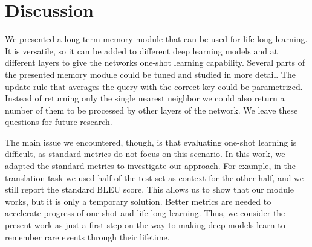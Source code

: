 \documentclass{article} \usepackage{iclr2017_conference,times}
\begin{document}
\section{Discussion}

We presented a long-term memory module that can be used for life-long learning.
It is versatile, so it can be added to different deep learning models and
at different layers to give the networks one-shot learning capability.
Several parts of the presented memory module could be tuned and studied
in more detail. The update rule that averages the query with the correct
key could be parametrized. Instead of returning only the single nearest neighbor
we could also return a number of them to be processed by other layers of
the network. We leave these questions for future research.

The main issue we encountered, though, is that evaluating one-shot learning
is difficult, as standard metrics do not focus on this scenario. In this work,
we adapted the standard metrics to investigate our approach. For example,
in the translation task we used half of the test set as context for the other half,
and we still report the standard BLEU score. This allows us to show that our
module works, but it is only a temporary solution.
Better metrics are needed to accelerate progress of one-shot and life-long learning.
Thus, we consider the present work as just a first step on the way to making
deep models learn to remember rare events through their lifetime.






\end{document}
